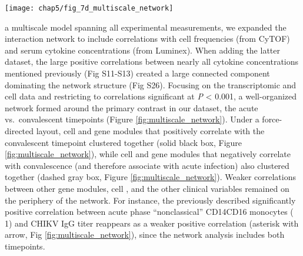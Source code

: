 \begin{figure*}[htb]
  \centering
  \texttt{[image: chap5/fig\_7d\_multiscale\_network]}
  \caption[Multiscale network of cell sub-community and coEM eigengenes]{
  \textbf{Multiscale network of cell sub-community and coEM eigengenes depicted with a force-directed layout and edge bundling.} Gold nodes, cell sub-communities; gray nodes, coEM eigengenes; large diamonds, clinical variables; red edges, positive correlations; blue edges, negative correlations. Edges are filtered to correlations significant at \emph{P} < 0.001, and thickness corresponds to the square of the correlations. A cluster of sub-communities and coEMs associated with convalescence (solid black box) and a corresponding cluster of sub-communities and coEMs associated with acute infection (dashed gray box) surround the “convalescent” node. A positive correlation between 15d post symptom onset CHIKV IgG titer and CD14+ CD16+ monocyte sub-community 1 (shown previously for acute phase samples in Figure \ref{fig:corr_cytof_igg}) is also visible (asterisk and arrow).
  }
  \label{fig:multiscale_network}
\end{figure*}

 a multiscale model spanning all experimental measurements, we expanded the interaction network to include correlations with cell \subcommunity{} frequencies (from CyTOF) and serum cytokine concentrations (from Luminex). When adding the latter dataset, the large positive correlations between nearly all cytokine concentrations mentioned previously (Fig S11-S13) created a large connected component dominating the network structure (Fig S26). Focusing on the transcriptomic and cell \subcommunity{} data and restricting to correlations significant at \emph{P} < 0.001, a well-organized network formed around the primary contrast in our dataset, the acute vs.\ convalescent timepoints (Figure \ref{fig:multiscale_network}). Under a force-directed layout, cell \subcommunities{} and gene modules that positively correlate with the convalescent timepoint clustered together (solid black box, Figure \ref{fig:multiscale_network}), while cell \subcommunities{} and gene modules that negatively correlate with convalescence (and therefore associate with acute infection) also clustered together (dashed gray box, Figure \ref{fig:multiscale_network}). Weaker correlations between other gene modules, cell \subcommunities{}, and the other clinical variables remained on the periphery of the network. For instance, the previously described significantly positive correlation between acute phase “nonclassical” CD14\sups{+}\allowbreak CD16\sups{++} monocytes (\subcommunity{} 1) and CHIKV IgG titer reappears as a weaker positive correlation (asterisk with arrow, Fig \ref{fig:multiscale_network}), since the network analysis includes both timepoints.

